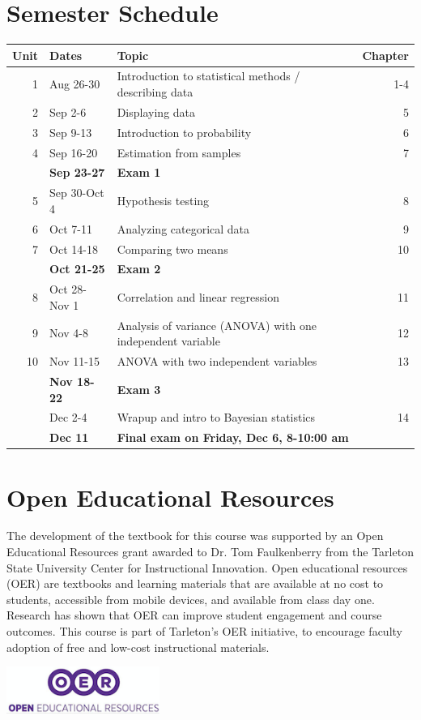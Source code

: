 \documentclass[10pt]{article}
\begin{document}
\section*{Semester Schedule}
\label{sec:org0527ece}
\begin{center}
\begin{tabular}{rllr}
Unit & Dates & Topic & Chapter\\
\hline
1 & Aug 26-30 & Introduction to statistical methods / describing data & 1-4\\
2 & Sep 2-6 & Displaying data & 5\\
3 & Sep 9-13 & Introduction to probability & 6\\
4 & Sep 16-20 & Estimation from samples & 7\\
 & \textbf{Sep 23-27} & \textbf{Exam 1} & \\
5 & Sep 30-Oct 4 & Hypothesis testing & 8\\
6 & Oct 7-11 & Analyzing categorical data & 9\\
7 & Oct 14-18 & Comparing two means & 10\\
 & \textbf{Oct 21-25} & \textbf{Exam 2} & \\
8 & Oct 28-Nov 1 & Correlation and linear regression & 11\\
9 & Nov 4-8 & Analysis of variance (ANOVA) with one independent variable & 12\\
10 & Nov 11-15 & ANOVA with two independent variables & 13\\
 & \textbf{Nov 18-22} & \textbf{Exam 3} & \\
 & Dec 2-4 & Wrapup and intro to Bayesian statistics & 14\\
 & \textbf{Dec 11} & \textbf{Final exam on Friday, Dec 6, 8-10:00 am} & \\
\end{tabular}
\end{center}

\section*{Open Educational Resources}
\label{sec:org26057e0}
The development of the textbook for this course was supported by an Open Educational Resources grant awarded to Dr. Tom Faulkenberry from the Tarleton State University Center for Instructional Innovation. Open educational resources (OER) are textbooks and learning materials that are available at no cost to students, accessible from mobile devices, and available from class day one. Research has shown that OER can improve student engagement and course outcomes. This course is part of Tarleton’s OER initiative, to encourage faculty adoption of free and low-cost instructional materials.


\begin{center}
\includegraphics[width=5cm]{oerLogo.png}
\end{center}
\end{document}
